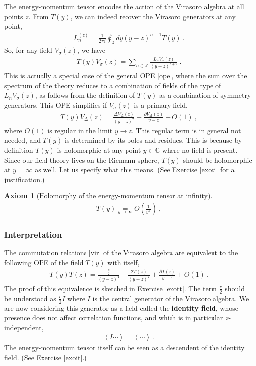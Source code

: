 \documentclass[12pt, a4paper, notitlepage, twoside]{report}
\numberwithin{equation}{section}
\theoremstyle{break}
\newtheorem{hyp}{Axiom}[chapter]
\begin{document}
The energy-momentum tensor encodes the action of the Virasoro algebra at all points $z$. 
From $T(y)$, we can indeed recover the Virasoro generators at any point,
\begin{align}
\boxed{ L_n^{(z)} = \frac{1}{2\pi i}\oint_{z} dy (y-z)^{n+1} T(y)} \ .
\label{lit}
\end{align}
So, for any field $V_\sigma(z)$, we have
\begin{align}
 T(y)V_\sigma(z) = \sum_{n\in{\mathbb{Z}}} \frac{L_n V_\sigma(z)}{(y-z)^{n+2}}\ .
\label{tv}
\end{align}
This is actually a special case of the general OPE \eqref{ope}, where the sum over the spectrum of the theory reduces to a combination of fields of the type of $L_n V_\sigma(z)$, as follows from the definition of $T(y)$ as a combination of symmetry generators.
This OPE simplifies if $V_\sigma(z)$ is a primary field, 
\begin{align}
 \boxed{T(y) V_\Delta(z) = \frac{\Delta V_\Delta(z)}{(y-z)^2} + \frac{\partial V_\Delta(z)}{y-z} + O(1)}\ ,
\label{tvp}
\end{align}
where $O(1)$ is regular in the limit $y\to z$.
This regular term is in general not needed, and $T(y)$ is determined by its poles and residues. This is because by definition $T(y)$ is holomorphic at any point $y\in\mathbb{C}$ where no field is present.
Since our field theory lives on the Riemann sphere, $T(y)$ should be holomorphic at $y=\infty$ as well. Let us specify what this means. (See Exercise \ref{exoti} for a justification.)

\begin{hyp}[Holomorphy of the energy-momentum tensor at infinity]
 \label{ax:hti}
 \begin{align}
 \boxed{T(y) \underset{y\to \infty}{=} O\left(\frac{1}{y^4}\right)}\ ,
\label{tyi}
\end{align}
\end{hyp} 
\noindent

\subsubsection{Interpretation}

The commutation relations \eqref{vir} of the Virasoro algebra are equivalent to the following OPE of the field $T(y)$ with itself,
\begin{align}
 \boxed{T(y)T(z) = \frac{\frac{c}{2}}{(y-z)^4} + \frac{2T(z)}{(y-z)^2} + \frac{\partial T(z)}{y-z} + O(1)}\ .
\label{tt}
\end{align}
The proof of this equivalence is sketched in Exercise \ref{exott}. 
The term $\frac{c}{2}$ should be understood as $\frac{c}{2}I$ where $I$ is the
central generator of the Virasoro algebra.
We are now considering this generator as a field called the 
\textbf{\boldmath identity field}, whose presence does not affect correlation functions, and which is in particular $z$-independent,
\begin{align}
 \left\langle I \cdots \right\rangle = \left\langle \cdots \right\rangle \ .
\label{ivac}
\end{align}
The energy-momentum tensor itself can be seen as a descendent of the identity field. (See Exercise \ref{exoit}.)
\end{document}
